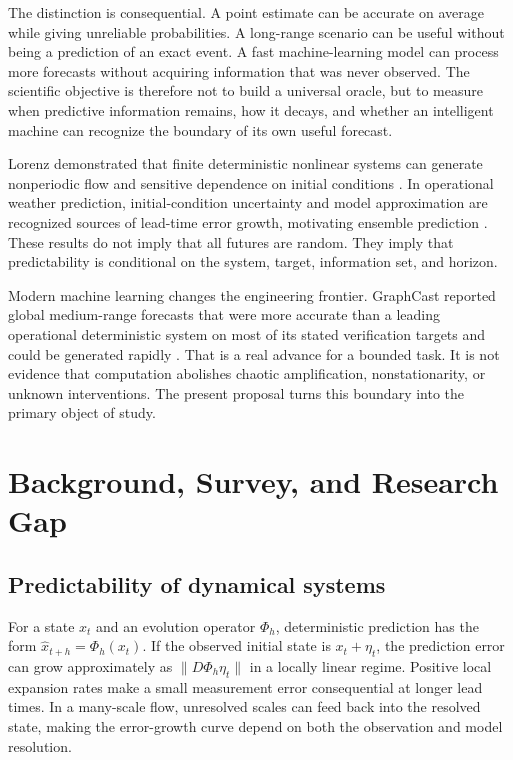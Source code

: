 \documentclass[conference]{IEEEtran}
\begin{document}
The distinction is consequential. A point estimate can be accurate on average while giving unreliable probabilities. A long-range scenario can be useful without being a prediction of an exact event. A fast machine-learning model can process more forecasts without acquiring information that was never observed. The scientific objective is therefore not to build a universal oracle, but to measure when predictive information remains, how it decays, and whether an intelligent machine can recognize the boundary of its own useful forecast.

Lorenz demonstrated that finite deterministic nonlinear systems can generate nonperiodic flow and sensitive dependence on initial conditions \cite{lorenz1963,lorenz1969}. In operational weather prediction, initial-condition uncertainty and model approximation are recognized sources of lead-time error growth, motivating ensemble prediction \cite{ecmwf,leutbecher2008}. These results do not imply that all futures are random. They imply that predictability is conditional on the system, target, information set, and horizon.

Modern machine learning changes the engineering frontier. GraphCast reported global medium-range forecasts that were more accurate than a leading operational deterministic system on most of its stated verification targets and could be generated rapidly \cite{lam2023}. That is a real advance for a bounded task. It is not evidence that computation abolishes chaotic amplification, nonstationarity, or unknown interventions. The present proposal turns this boundary into the primary object of study.

\section{Background, Survey, and Research Gap}
\subsection{Predictability of dynamical systems}
For a state $x_t$ and an evolution operator $\Phi_h$, deterministic prediction has the form $\hat{x}_{t+h}=\Phi_h(x_t)$. If the observed initial state is $x_t+\eta_t$, the prediction error can grow approximately as $\|D\Phi_h\eta_t\|$ in a locally linear regime. Positive local expansion rates make a small measurement error consequential at longer lead times. In a many-scale flow, unresolved scales can feed back into the resolved state, making the error-growth curve depend on both the observation and model resolution.
\end{document}
